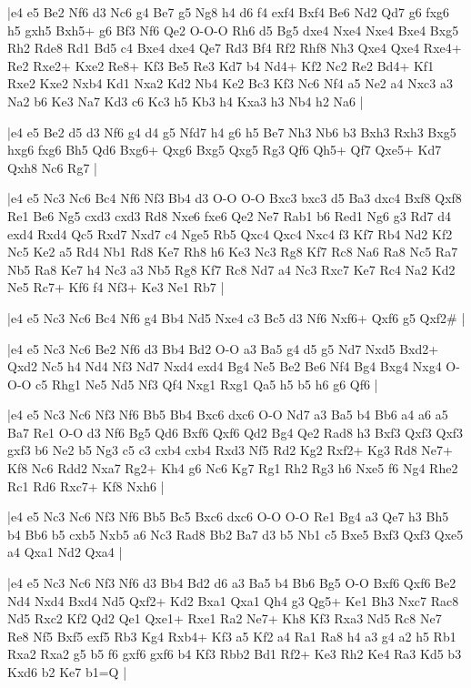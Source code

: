 \whitename{}
\blackname{}
\makegametitle
|e4 e5 Be2 Nf6 d3 Nc6 g4 Be7 g5 Ng8 h4 d6 f4 exf4 Bxf4 Be6 Nd2 Qd7 g6 fxg6 h5 gxh5 Bxh5+ g6 Bf3 Nf6 Qe2 O-O-O Rh6 d5 Bg5 dxe4 Nxe4 Nxe4 Bxe4 Bxg5 Rh2 Rde8 Rd1 Bd5 c4 Bxe4 dxe4 Qe7 Rd3 Bf4 Rf2 Rhf8 Nh3 Qxe4 Qxe4 Rxe4+ Re2 Rxe2+ Kxe2 Re8+ Kf3 Be5 Re3 Kd7 b4 Nd4+ Kf2 Nc2 Re2 Bd4+ Kf1 Rxe2 Kxe2 Nxb4 Kd1 Nxa2 Kd2 Nb4 Ke2 Bc3 Kf3 Nc6 Nf4 a5 Ne2 a4 Nxc3 a3 Na2 b6 Ke3 Na7 Kd3 c6 Kc3 h5 Kb3 h4 Kxa3 h3 Nb4 h2 Na6  |

\whitename{}
\blackname{}
\makegametitle
|e4 e5 Be2 d5 d3 Nf6 g4 d4 g5 Nfd7 h4 g6 h5 Be7 Nh3 Nb6 b3 Bxh3 Rxh3 Bxg5 hxg6 fxg6 Bh5 Qd6 Bxg6+ Qxg6 Bxg5 Qxg5 Rg3 Qf6 Qh5+ Qf7 Qxe5+ Kd7 Qxh8 Nc6 Rg7  |

\whitename{}
\blackname{}
\makegametitle
|e4 e5 Nc3 Nc6 Bc4 Nf6 Nf3 Bb4 d3 O-O O-O Bxc3 bxc3 d5 Ba3 dxc4 Bxf8 Qxf8 Re1 Be6 Ng5 cxd3 cxd3 Rd8 Nxe6 fxe6 Qe2 Ne7 Rab1 b6 Red1 Ng6 g3 Rd7 d4 exd4 Rxd4 Qc5 Rxd7 Nxd7 c4 Nge5 Rb5 Qxc4 Qxc4 Nxc4 f3 Kf7 Rb4 Nd2 Kf2 Nc5 Ke2 a5 Rd4 Nb1 Rd8 Ke7 Rh8 h6 Ke3 Nc3 Rg8 Kf7 Rc8 Na6 Ra8 Nc5 Ra7 Nb5 Ra8 Ke7 h4 Nc3 a3 Nb5 Rg8 Kf7 Rc8 Nd7 a4 Nc3 Rxc7 Ke7 Rc4 Na2 Kd2 Ne5 Rc7+ Kf6 f4 Nf3+ Ke3 Ne1 Rb7  |

\whitename{}
\blackname{}
\makegametitle
|e4 e5 Nc3 Nc6 Bc4 Nf6 g4 Bb4 Nd5 Nxe4 c3 Bc5 d3 Nf6 Nxf6+ Qxf6 g5 Qxf2\#  |

\whitename{}
\blackname{}
\makegametitle
|e4 e5 Nc3 Nc6 Be2 Nf6 d3 Bb4 Bd2 O-O a3 Ba5 g4 d5 g5 Nd7 Nxd5 Bxd2+ Qxd2 Nc5 h4 Nd4 Nf3 Nd7 Nxd4 exd4 Bg4 Ne5 Be2 Be6 Nf4 Bg4 Bxg4 Nxg4 O-O-O c5 Rhg1 Ne5 Nd5 Nf3 Qf4 Nxg1 Rxg1 Qa5 h5 b5 h6 g6 Qf6  |

\whitename{}
\blackname{}
\makegametitle
|e4 e5 Nc3 Nc6 Nf3 Nf6 Bb5 Bb4 Bxc6 dxc6 O-O Nd7 a3 Ba5 b4 Bb6 a4 a6 a5 Ba7 Re1 O-O d3 Nf6 Bg5 Qd6 Bxf6 Qxf6 Qd2 Bg4 Qe2 Rad8 h3 Bxf3 Qxf3 Qxf3 gxf3 b6 Ne2 b5 Ng3 c5 c3 cxb4 cxb4 Rxd3 Nf5 Rd2 Kg2 Rxf2+ Kg3 Rd8 Ne7+ Kf8 Nc6 Rdd2 Nxa7 Rg2+ Kh4 g6 Nc6 Kg7 Rg1 Rh2 Rg3 h6 Nxe5 f6 Ng4 Rhe2 Rc1 Rd6 Rxc7+ Kf8 Nxh6  |

\whitename{}
\blackname{}
\makegametitle
|e4 e5 Nc3 Nc6 Nf3 Nf6 Bb5 Bc5 Bxc6 dxc6 O-O O-O Re1 Bg4 a3 Qe7 h3 Bh5 b4 Bb6 b5 cxb5 Nxb5 a6 Nc3 Rad8 Bb2 Ba7 d3 b5 Nb1 c5 Bxe5 Bxf3 Qxf3 Qxe5 a4 Qxa1 Nd2 Qxa4  |

\whitename{}
\blackname{}
\makegametitle
|e4 e5 Nc3 Nc6 Nf3 Nf6 d3 Bb4 Bd2 d6 a3 Ba5 b4 Bb6 Bg5 O-O Bxf6 Qxf6 Be2 Nd4 Nxd4 Bxd4 Nd5 Qxf2+ Kd2 Bxa1 Qxa1 Qh4 g3 Qg5+ Ke1 Bh3 Nxc7 Rac8 Nd5 Rxc2 Kf2 Qd2 Qe1 Qxe1+ Rxe1 Ra2 Ne7+ Kh8 Kf3 Rxa3 Nd5 Rc8 Ne7 Re8 Nf5 Bxf5 exf5 Rb3 Kg4 Rxb4+ Kf3 a5 Kf2 a4 Ra1 Ra8 h4 a3 g4 a2 h5 Rb1 Rxa2 Rxa2 g5 b5 f6 gxf6 gxf6 b4 Kf3 Rbb2 Bd1 Rf2+ Ke3 Rh2 Ke4 Ra3 Kd5 b3 Kxd6 b2 Ke7 b1=Q  |

